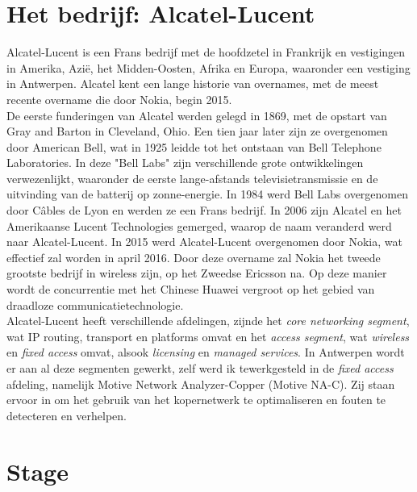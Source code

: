 \documentclass[10pt,a4paper]{article}
\begin{document}
\section{Het bedrijf: Alcatel-Lucent}
\label{bedrijf}
Alcatel-Lucent is een Frans bedrijf met de hoofdzetel in Frankrijk en vestigingen in Amerika, Azi\"e, het Midden-Oosten, Afrika en Europa, waaronder een vestiging in Antwerpen. Alcatel kent een lange historie van overnames, met de meest recente overname die door Nokia, begin 2015.\\
De eerste funderingen van Alcatel werden gelegd in 1869, met de opstart van Gray and Barton in Cleveland, Ohio. Een tien jaar later zijn ze overgenomen door American Bell, wat in 1925 leidde tot het ontstaan van Bell Telephone Laboratories. In deze "Bell Labs" zijn verschillende grote ontwikkelingen verwezenlijkt, waaronder de eerste lange-afstands televisietransmissie en de uitvinding van de batterij op zonne-energie.  In 1984 werd Bell Labs overgenomen door C\^ables de Lyon en werden ze een Frans bedrijf. In 2006 zijn Alcatel en het Amerikaanse Lucent Technologies gemerged, waarop de naam veranderd werd naar Alcatel-Lucent. In 2015 werd Alcatel-Lucent overgenomen door Nokia, wat effectief zal worden in april 2016. Door deze overname zal Nokia het tweede grootste bedrijf in wireless zijn, op het Zweedse Ericsson na. Op deze manier wordt de concurrentie met het Chinese Huawei vergroot op het gebied van draadloze communicatietechnologie.\\
Alcatel-Lucent heeft verschillende afdelingen, zijnde het \textit{core networking segment}, wat IP routing, transport en platforms omvat en het \textit{access segment}, wat \textit{wireless} en \textit{fixed access} omvat, alsook \textit{licensing} en \textit{managed services}. In Antwerpen wordt er aan al deze segmenten gewerkt, zelf werd ik tewerkgesteld in de \textit{fixed access} afdeling, namelijk Motive Network Analyzer-Copper (Motive NA-C). Zij staan ervoor in om het gebruik van het kopernetwerk te optimaliseren en fouten te detecteren en verhelpen.\\ 

\section{Stage}
\label{stage}
\end{document}
